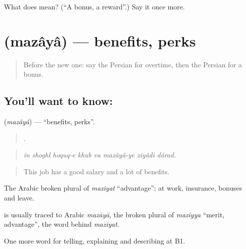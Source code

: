 \begin{tcolorbox}[breakable,colback=teal!4,colframe=teal!35!black,title={Before you move on}]
What does  mean? (\textquotedblleft{}A bonus, a reward\textquotedblright{}.) Say it once more.
\end{tcolorbox}
\section[\texorpdfstring{\fa{مزایا} (mazâyâ)}{مزایا (mazâyâ)}]{ (mazâyâ) — benefits, perks}

\label{lesson:FA-C378-mazaya}



\begin{quote}
Before the new one: say the Persian for overtime, then the Persian for a bonus.
\end{quote}

\subsection*{You'll want to know: }
\textbf{} (\emph{mazâyâ}) — \textquotedblleft{}benefits, perks\textquotedblright{}.

\begin{quote}
       .
\end{quote}

\begin{quote}
\emph{in shoghl hoquq-e khub va mazâyâ-ye ziyâdi dârad.}
\end{quote}

\begin{quote}
This job has a good salary and a lot of benefits.
\end{quote}

The Arabic broken plural of \emph{maziyat} \textquotedblleft{}advantage\textquotedblright{}; at work, insurance, bonuses and leave.

\begin{cousinweb}
\textbf{} is usually traced to Arabic \emph{mazāyā}, the broken plural of \emph{maziyya} \textquotedblleft{}merit, advantage\textquotedblright{}, the word behind \emph{maziyat}.
\end{cousinweb}

\begin{grammarlens}[title={What you've built}]
One more word for telling, explaining and describing at B1.
\end{grammarlens}

